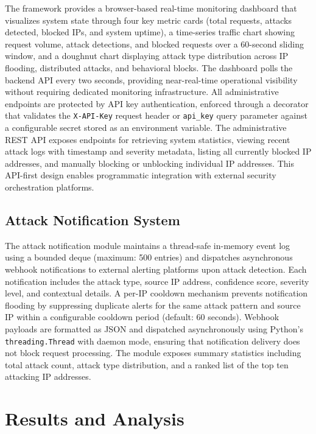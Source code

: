 \documentclass[conference]{IEEEtran}
\begin{document}
The framework provides a browser-based real-time monitoring dashboard that visualizes system state through four key metric cards (total requests, attacks detected, blocked IPs, and system uptime), a time-series traffic chart showing request volume, attack detections, and blocked requests over a 60-second sliding window, and a doughnut chart displaying attack type distribution across IP flooding, distributed attacks, and behavioral blocks. The dashboard polls the backend API every two seconds, providing near-real-time operational visibility without requiring dedicated monitoring infrastructure. All administrative endpoints are protected by API key authentication, enforced through a decorator that validates the \texttt{X-API-Key} request header or \texttt{api\_key} query parameter against a configurable secret stored as an environment variable. The administrative REST API exposes endpoints for retrieving system statistics, viewing recent attack logs with timestamp and severity metadata, listing all currently blocked IP addresses, and manually blocking or unblocking individual IP addresses. This API-first design enables programmatic integration with external security orchestration platforms.

\subsection{Attack Notification System}

The attack notification module maintains a thread-safe in-memory event log using a bounded deque (maximum: 500 entries) and dispatches asynchronous webhook notifications to external alerting platforms upon attack detection. Each notification includes the attack type, source IP address, confidence score, severity level, and contextual details. A per-IP cooldown mechanism prevents notification flooding by suppressing duplicate alerts for the same attack pattern and source IP within a configurable cooldown period (default: 60 seconds). Webhook payloads are formatted as JSON and dispatched asynchronously using Python's \texttt{threading.Thread} with daemon mode, ensuring that notification delivery does not block request processing. The module exposes summary statistics including total attack count, attack type distribution, and a ranked list of the top ten attacking IP addresses.

\section{Results and Analysis}
\end{document}
